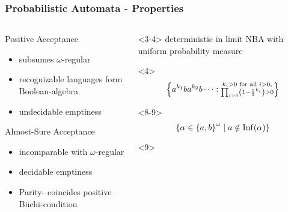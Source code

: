 \documentclass{beamer}
\begin{document}
  \begin{frame}
    \frametitle{Probabilistic Automata - Properties}
    \begin{columns}
      \begin{column}{0.5\textwidth}
        \small{Positive Acceptance}
        \begin{itemize}
          \item<2-> subsumes $\omega$-regular
          \item<5-> recognizable languages form Boolean-algebra
          \item<6-> undecidable emptiness
        \end{itemize}
        \small{Almost-Sure Acceptance}
        \begin{itemize}
          \item<7-> incomparable with $\omega$-regular
          \item<10-> decidable emptiness
          \item<11-> \alert{Parity-} coincides positive Büchi-condition
        \end{itemize}
      \end{column}
      \begin{column}{0.5\textwidth}
        \begin{overlayarea}{\textwidth}{\textheight}
          \begin{onlyenv}<3-4>
            \vspace{0.3\textheight}
            deterministic in limit \ac{NBA} with uniform probability measure
            \vfill
            \begin{uncoverenv}<4>
              \begin{equation*}
                \left\{
                  a^{k_{1}}ba^{k_{2}}b\dots:
                  \substack{k_{i}>0\text{ for all }i>0,\\
                  \prod_{i>0}\left(1-\frac{1}{2}^{k_{i}}\right) > 0}
                \right\}
              \end{equation*}
            \end{uncoverenv}
          \end{onlyenv}
          \begin{onlyenv}<8-9>
            \vspace{0.2\textheight}
            \begin{equation*}
              \left\{\alpha\in\left\{a,b\right\}^{\omega}\mid a\notin\operatorname{Inf}(\alpha)\right\}
            \end{equation*}
            \vfill
            \begin{uncoverenv}<9>

\end{uncoverenv}
\end{onlyenv}
\end{overlayarea}
\end{column}
\end{columns}
\end{frame}
\end{document}
